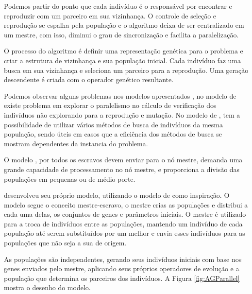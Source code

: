 Podemos partir do ponto que cada indivíduo é o responsável por encontrar e reproduzir com um parceiro em sua vizinhança. O controle de seleção e reprodução se espalha pela população e o algoritmo deixa de ser centralizado em um mestre, com isso, diminui o grau de sincronização e facilita a paralelização. 

O processo do algoritmo é definir uma representação genética para o problema e criar a estrutura de vizinhança e sua população inicial. Cada indivíduo faz uma busca em sua vizinhança e seleciona um parceiro para a reprodução. Uma geração descendente é criada com o operador genético resultante. \cite{Heinz}

Podemos observar alguns problemas nos modelos apresentados \cite{Vilson}, no modelo de \cite{Jason} existe problema em explorar o paralelismo no cálculo de verificação dos indivíduos não explorando para a reprodução e mutação. No modelo de \cite{Heinz}, tem a possibilidade de utilizar vários métodos de busca de indivíduos da mesma população, sendo úteis em casos que a eficiência dos métodos de busca se mostram dependentes da instancia do problema. 

O modelo \cite{Alaoui}, por todos os escravos devem enviar para o nó mestre, demanda uma grande capacidade de processamento no nó mestre, e proporciona a divisão das populações em pequenas ou de médio porte.

 \cite{Vilson} desenvolveu seu próprio modelo, utilizando o modelo de \cite{Alaoui} como inspiração. O modelo segue o conceito mestre-escravo, o mestre crias as populações e distribui a cada uma delas, os conjuntos de genes e parâmetros iniciais. O mestre é utilizado para a troca de indivíduos entre as populações, mantendo um indivíduo de cada população até serem substituídos por um melhor e envia esses indivíduos para as populações que não seja a sua de origem. 
 
 As populações são independentes, gerando seus indivíduos iniciais com base nos genes enviados pelo mestre, aplicando seus próprios operadores de evolução e a população que determina os parceiros dos indivíduos.
 A Figura \ref{fig:AGParallel} mostra o desenho do modelo.
 
 \begin{minipage}{\linewidth}
 	\label{fig:AGParallel}
 \end{minipage}
 